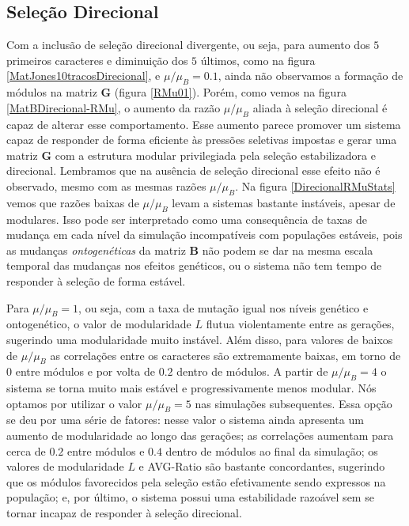 \subsection{Seleção Direcional}
\label{cap3:DirecB}

Com a inclusão de seleção direcional divergente, ou seja, para aumento
dos $5$ primeiros caracteres e diminuição dos $5$ últimos, como na
figura \ref{MatJones10tracosDirecional}, e $\mu/\mu_B = 0.1$, ainda não
observamos a formação de módulos na matriz $\mathbf{G}$ (figura
\ref{RMu01}).
Porém, como vemos na figura \ref{MatBDirecional-RMu}, o aumento  da
razão $\mu/\mu_B$ aliada à seleção direcional é capaz de alterar esse
comportamento.
Esse aumento parece promover um sistema capaz de responder de forma
eficiente às pressões seletivas impostas e gerar uma matriz $\mathbf{G}$ com a
estrutura modular privilegiada pela seleção estabilizadora e direcional.
Lembramos que na ausência de seleção direcional esse efeito não é
observado, mesmo com as mesmas razões $\mu/\mu_B$.
Na figura \ref{DirecionalRMuStats} vemos que razões baixas de $\mu/\mu_B$ levam
a sistemas bastante instáveis, apesar de modulares.
Isso pode ser interpretado como uma consequência de taxas de mudança em
cada nível da simulação incompatíveis com populações estáveis, pois as
mudanças {\it ontogenéticas} da matriz $\mathbf{B}$ não podem se dar na
mesma escala temporal das mudanças nos efeitos genéticos, ou o sistema
não tem tempo de responder à seleção de forma estável.

Para $\mu/\mu_B=1$, ou seja, com a taxa de mutação igual nos níveis
genético e ontogenético, o valor de modularidade $L$ flutua violentamente entre
as gerações, sugerindo uma modularidade muito instável.
Além disso, para valores de baixos de $\mu/\mu_B$ as correlações entre
os caracteres são extremamente baixas, em torno de $0$ entre módulos e
por volta de $0.2$ dentro de módulos.
A partir de $\mu/\mu_B=4$ o sistema se torna muito mais estável e
progressivamente menos modular.
Nós optamos por utilizar o valor $\mu/\mu_B=5$ nas simulações
subsequentes.
Essa opção se deu por uma série de fatores: nesse valor o sistema ainda
apresenta um aumento de modularidade ao longo das gerações; as
correlações aumentam para cerca de $0.2$ entre módulos e $0.4$ dentro de
módulos ao final da simulação; os valores de modularidade $L$ e
AVG-Ratio são bastante concordantes, sugerindo que os módulos
favorecidos pela seleção estão efetivamente sendo expressos na
população; e, por último, o sistema possui uma estabilidade razoável sem
se tornar incapaz de responder à seleção direcional.

